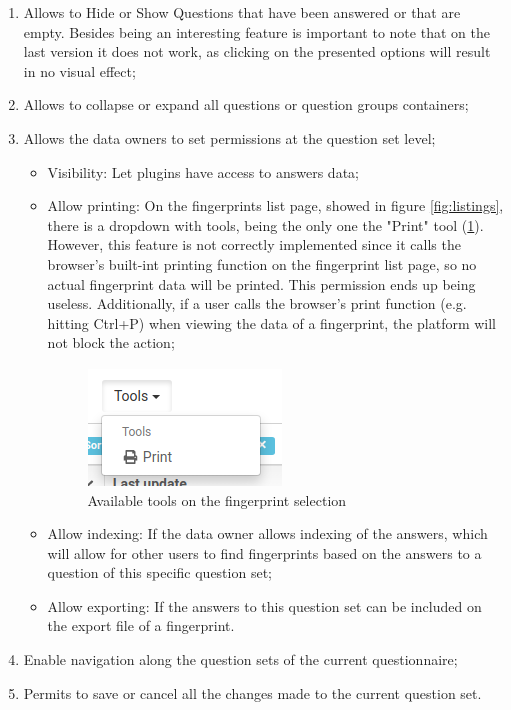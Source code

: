 \begin{enumerate}
    \item Allows to Hide or Show Questions that have been answered or that are empty. Besides being an interesting feature is important to note that on the last version it does not work, as clicking on the presented options will result in no visual effect;
    \item Allows to collapse or expand all questions or question groups containers;
    \item Allows the data owners to set permissions at the question set level;
        \begin{itemize}
            \item Visibility: Let plugins have access to answers data;
            \item Allow printing: On the fingerprints list page, showed in figure \ref{fig:listings}, there is a dropdown with tools, being the only one the "Print" tool (\ref{fig:listings-tools}). However, this feature is not correctly implemented since it calls the browser's built-int printing function on the fingerprint list page, so no actual fingerprint data will be printed. This permission ends up being useless. Additionally, if a user calls the browser's print function (e.g. hitting Ctrl+P) when viewing the data of a fingerprint, the platform will not block the action;
                \begin{figure}[H]
                    \center
                    \includegraphics[width=.2\linewidth]{listings-tools}
                    \caption{Available tools on the fingerprint selection}
                    \label{fig:listings-tools}
                \end{figure}
            \item Allow indexing: If the data owner allows indexing of the answers, which will allow for other users to find fingerprints based on the answers to a question of this specific question set;
            \item Allow exporting: If the answers to this question set can be included on the export file of a fingerprint.
        \end{itemize}
    \item Enable navigation along the question sets of the current questionnaire;
    \item Permits to save or cancel all the changes made to the current question set.
\end{enumerate}

